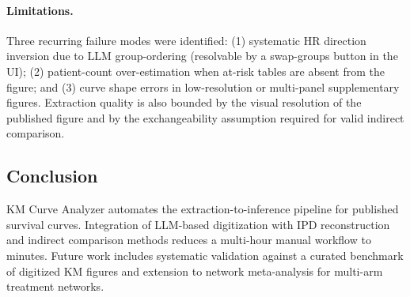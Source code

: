 \documentclass{amia}
\begin{document}
\paragraph{Limitations.}
Three recurring failure modes were identified: (1) systematic HR direction
inversion due to LLM group-ordering (resolvable by a swap-groups button in
the UI); (2) patient-count over-estimation when at-risk tables are
absent from the figure; and (3) curve shape errors in low-resolution or
multi-panel supplementary figures. Extraction quality is also bounded by
the visual resolution of the published figure and by the exchangeability
assumption required for valid indirect comparison.

\subsection*{Conclusion}

KM Curve Analyzer automates the extraction-to-inference pipeline for
published survival curves. Integration of LLM-based digitization with IPD
reconstruction and indirect comparison methods reduces a multi-hour manual
workflow to minutes. Future work includes systematic validation against a
curated benchmark of digitized KM figures and extension to network
meta-analysis for multi-arm treatment networks.

\makeatletter
\renewcommand{\@biblabel}[1]{\hfill #1.}
\makeatother



\end{document}
